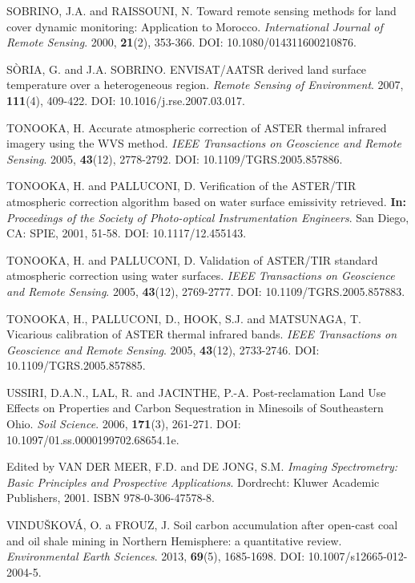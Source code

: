 \begin{thebibliography}{10}
 SOBRINO, J.A. and RAISSOUNI, N. Toward remote sensing methods for land cover dynamic monitoring: Application to Morocco. \textit{International Journal of Remote Sensing}. 2000, \textbf{21}(2), 353-366. DOI: 10.1080/014311600210876.

 SÒRIA, G. and J.A. SOBRINO. ENVISAT/AATSR derived land surface temperature over a heterogeneous region. \textit{Remote Sensing of Environment}. 2007, \textbf{111}(4), 409-422. DOI: 10.1016/j.rse.2007.03.017.

 TONOOKA, H. Accurate atmospheric correction of ASTER thermal infrared imagery using the WVS method. \textit{IEEE Transactions on Geoscience and Remote Sensing}. 2005, \textbf{43}(12), 2778-2792. DOI: 10.1109/TGRS.2005.857886.

 TONOOKA, H. and PALLUCONI, D. Verification of the ASTER/TIR atmospheric correction algorithm based on water surface emissivity retrieved. \textbf{In:} \textit{Proceedings of the Society of Photo-optical Instrumentation Engineers}. San Diego, CA: SPIE, 2001, 51-58. DOI: 10.1117/12.455143.

 TONOOKA, H. and PALLUCONI, D. Validation of ASTER/TIR standard atmospheric correction using water surfaces. \textit{IEEE Transactions on Geoscience and Remote Sensing}. 2005, \textbf{43}(12), 2769-2777. DOI: 10.1109/TGRS.2005.857883.

  TONOOKA, H., PALLUCONI, D., HOOK, S.J. and MATSUNAGA, T. Vicarious calibration of ASTER thermal infrared bands. \textit{IEEE Transactions on Geoscience and Remote Sensing}. 2005, \textbf{43}(12), 2733-2746. DOI: 10.1109/TGRS.2005.857885.

 USSIRI, D.A.N., LAL, R. and JACINTHE, P.-A. Post-reclamation Land Use Effects on Properties and Carbon Sequestration in Minesoils of Southeastern Ohio. \textit{Soil Science}. 2006, \textbf{171}(3), 261-271. DOI: 10.1097/01.ss.0000199702.68654.1e.

 Edited by VAN DER MEER, F.D. and DE JONG, S.M. \textit{Imaging Spectrometry: Basic Principles and Prospective Applications}. Dordrecht: Kluwer Academic Publishers, 2001. ISBN 978-0-306-47578-8.

 VINDUŠKOVÁ, O. a FROUZ, J. Soil carbon accumulation after open-cast coal and oil shale mining in Northern Hemisphere: a quantitative review. \textit{Environmental Earth Sciences}. 2013, \textbf{69}(5), 1685-1698. DOI: 10.1007/s12665-012-2004-5. 


\end{thebibliography}
